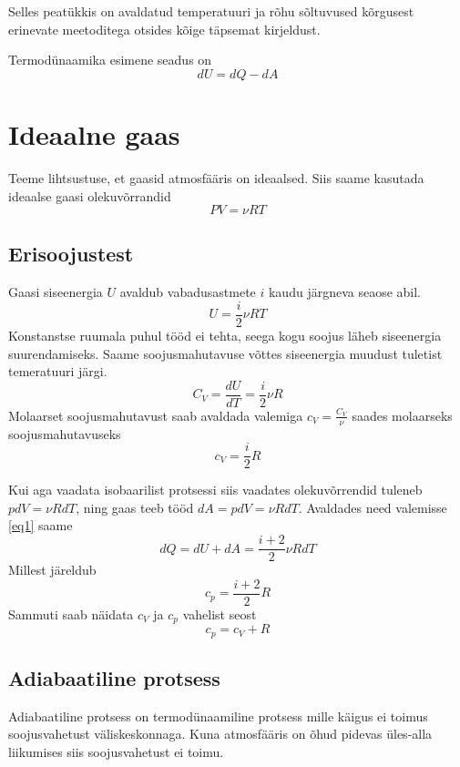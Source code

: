 \documentclass{trkut}%
\begin{document}
Selles peatükkis on avaldatud temperatuuri ja rõhu sõltuvused kõrgusest erinevate meetoditega otsides kõige täpsemat kirjeldust.

Termodünaamika esimene seadus on
\begin{equation}\label{eq1}
dU = dQ - dA
\end{equation}

\section{Ideaalne gaas}
Teeme lihtsustuse, et gaasid atmosfääris on ideaalsed. Siis saame kasutada ideaalse gaasi olekuvõrrandid
\begin{equation}\label{eq8}
PV=\nu RT
\end{equation}

\subsection{Erisoojustest}
Gaasi siseenergia $U$ avaldub vabadusastmete $i$ kaudu järgneva seaose abil.
\begin{equation}\label{eq5}
U = \frac{i}{2} \nu R T
\end{equation}
Konstanstse ruumala puhul tööd ei tehta, seega kogu soojus läheb siseenergia suurendamiseks. Saame soojusmahutavuse võttes siseenergia muudust tuletist temeratuuri järgi.
\begin{equation}\label{eq6}
C_V = \frac{dU}{dT}=\frac{i}{2}\nu R
\end{equation}
Molaarset soojusmahutavust saab avaldada valemiga $c_V = \frac{C_V}{\nu}$ saades molaarseks soojusmahutavuseks
\begin{equation}\label{eq7}
c_V = \frac{i}{2}R
\end{equation}

Kui aga vaadata isobaarilist protsessi siis vaadates olekuvõrrendid tuleneb $pdV=\nu RdT$, ning gaas teeb tööd $dA = pdV = \nu RdT$. Avaldades need valemisse \ref{eq1} saame
\begin{equation}
dQ = dU + dA = \frac{i+2}{2} \nu R dT
\end{equation}
Millest järeldub
\begin{equation}
c_p=\frac{i+2}{2}R
\end{equation}
Sammuti saab näidata $c_V$ ja $c_p$ vahelist seost
\begin{equation}\label{eq9}
c_p = c_V + R
\end{equation}
          
\subsection{Adiabaatiline protsess}
Adiabaatiline protsess on termodünaamiline protsess mille käigus ei toimus soojusvahetust väliskeskonnaga. Kuna atmosfääris on õhud pidevas üles-alla liikumises siis soojusvahetust ei toimu.
\end{document}
